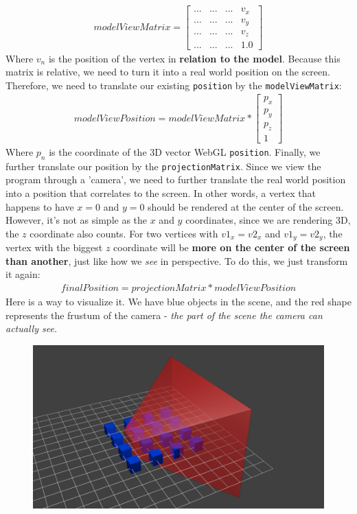 \begin{align*}
modelViewMatrix = 
\begin{bmatrix}
... & ... & ... & v_{x} \\
... & ... & ... & v_{y} \\
... & ... & ... & v_{z} \\
... & ... & ... & 1.0
\end{bmatrix}
\end{align*}
Where $v_{n}$ is the position of the vertex in \textbf{relation to the model}. Because this matrix is relative, we need to turn it into a real world position on the screen. Therefore, we need to translate our existing \verb|position| by the \verb|modelViewMatrix|:
\begin{align*}
modelViewPosition = modelViewMatrix *
\begin{bmatrix}
p_{x} \\ p_{y} \\ p_{z} \\ 1
\end{bmatrix}
\end{align*}
Where $p_{n}$ is the coordinate of the 3D vector WebGL \verb|position|.
\newpage
Finally, we further translate our position by the \verb|projectionMatrix|. Since we view the program through a 'camera', we need to further translate the real world position into a position that correlates to the screen. In other words, a vertex that happens to have $x = 0$ and $y = 0$ should be rendered at the center of the screen. However, it's not as simple as the $x$ and $y$ coordinates, since we are rendering 3D, the $z$ coordinate also counts. For two vertices with $v1_{x} = v2_{x}$ and $v1_{y} = v2_{y}$, the vertex with the biggest $z$ coordinate will be \textbf{more on the center of the screen than another}, just like how we \textit{see} in perspective. To do this, we just transform it again:
\begin{align*}
finalPosition = projectionMatrix * modelViewPosition
\end{align*}
Here is a way to visualize it. We have blue objects in the scene, and the red shape represents the frustum of the camera - \textit{the part of the scene the camera can actually see.}
\begin{figure}[h]
\centering
\includegraphics[width=0.5\linewidth]{images/shader_output3}
\caption{}
\label{fig:shaderoutput3}
\end{figure} \\
